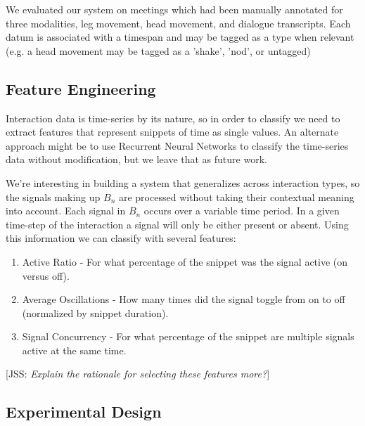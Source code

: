 \documentclass[conference]{IEEEtran}
\newcommand{\meta}[1]{{\textcolor[rgb]{0.1,0.7,0.2}{[JSS: {\it #1}]}}}
\begin{document}
We evaluated our system on meetings which had been manually annotated for three modalities, leg movement, head movement, and dialogue transcripts. Each datum is associated with a timespan and may be tagged as a type when relevant (e.g. a head movement may be tagged as a 'shake', 'nod', or untagged)

\subsection{Feature Engineering}\label{feature_engineering}
Interaction data is time-series by its nature, so in order to classify we need to extract features that represent snippets of time as single values. An alternate approach might be to use Recurrent Neural Networks to classify the time-series data without modification, but we leave that as future work. 

We're interesting in building a system that generalizes across interaction types, so the signals making up $B_n$ are processed without taking their contextual meaning into account. Each signal in $B_n$ occurs over a variable time period. In a given time-step of the interaction a signal will only be either present or absent. Using this information we can classify with several features:

\begin{enumerate}
    \item Active Ratio - For what percentage of the snippet was the signal active (on versus off).
    \item Average Oscillations - How many times did the signal toggle from on to off (normalized by snippet duration). 
    \item Signal Concurrency - For what percentage of the snippet are multiple signals active at the same time. 
\end{enumerate}

\meta{Explain the rationale for selecting these features more?}


\subsection{Experimental Design}
\end{document}
